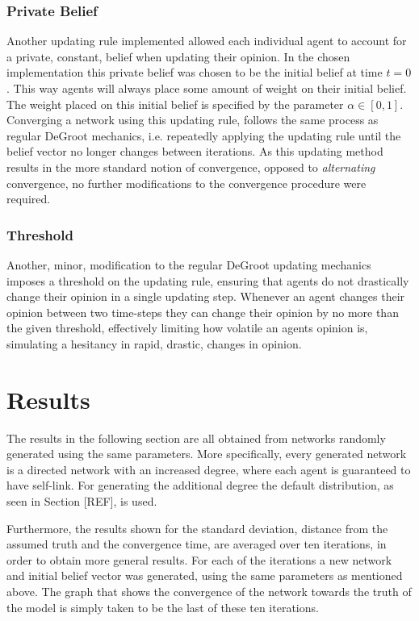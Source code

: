 \documentclass[a4paper, 12pt]{report}
\begin{document}
\subsection{Private Belief}

Another updating rule implemented allowed each individual agent to account for a private, constant, belief when updating their opinion. In the chosen implementation this private belief was chosen to be the initial belief at time $t=0$. This way agents will always place some amount of weight on their initial belief. The weight placed on this initial belief is specified by the parameter $\alpha \in [0, 1]$. Converging a network using this updating rule, follows the same process as regular DeGroot mechanics, i.e. repeatedly applying the updating rule until the belief vector no longer changes between iterations. As this updating method results in the more standard notion of convergence, opposed to \textit{alternating} convergence, no further modifications to the convergence procedure were required.

\subsection{Threshold}

Another, minor, modification to the regular DeGroot updating mechanics imposes a threshold on the updating rule, ensuring that agents do not drastically change their opinion in a single updating step. Whenever an agent changes their opinion between two time-steps they can change their opinion by no more than the given threshold, effectively limiting how volatile an agents opinion is, simulating a hesitancy in rapid, drastic, changes in opinion.

\newpage

\chapter{Results}
\label{results}

The results in the following section are all obtained from networks randomly generated using the same parameters. More specifically, every generated network is a directed network with an increased degree, where each agent is guaranteed to have self-link. For generating the additional degree the default distribution, as seen in Section [REF], is used.

\noindent Furthermore, the results shown for the standard deviation, distance from the assumed truth and the convergence time, are averaged over ten iterations, in order to obtain more general results. For each of the iterations a new network and initial belief vector was generated, using the same parameters as mentioned above. The graph that shows the convergence of the network towards the truth of the model is simply taken to be the last of these ten iterations.
\end{document}
